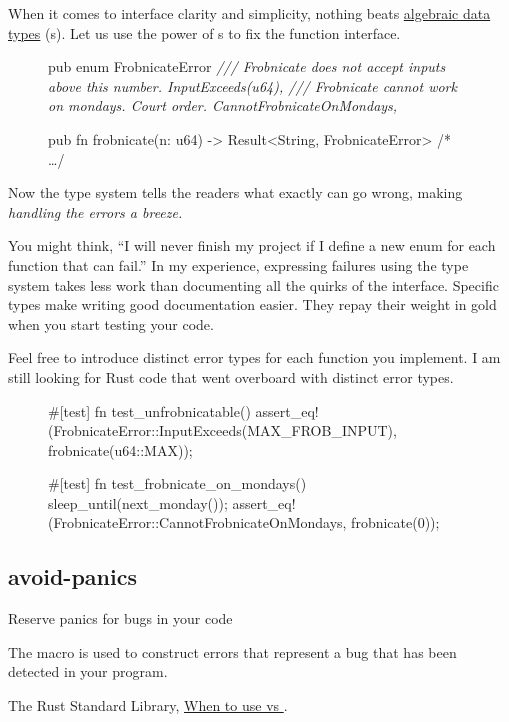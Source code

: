 \documentclass{article}
\begin{document}
When it comes to interface clarity and simplicity, nothing beats \href{https://en.wikipedia.org/wiki/Algebraic_data_type}{algebraic data types} (s).
Let us use the power of s to fix the  function interface.

\begin{figure}
\begin{code}[good]
pub enum FrobnicateError {
  \em{/// Frobnicate does not accept inputs above this number.}
  InputExceeds(u64),
  \em{/// Frobnicate cannot work on mondays. Court order.}
  CannotFrobnicateOnMondays,
}

pub fn frobnicate(n: u64) -> Result<String, FrobnicateError> { /* \ldots  */ }
\end{code}
\end{figure}


Now the type system tells the readers what exactly can go wrong, making \em{handling} the errors a breeze.

You might think, ``I will never finish my project if I define a new enum for each function that can fail.''
In my experience, expressing failures using the type system takes less work than documenting all the quirks of the interface.
Specific types make writing good documentation easier.
They repay their weight in gold when you start testing your code.

Feel free to introduce distinct error types for each function you implement.
I am still looking for Rust code that went overboard with distinct error types.

\begin{figure}
\begin{code}[good]
#[test]
fn test_unfrobnicatable() {
  assert_eq!(FrobnicateError::InputExceeds(MAX_FROB_INPUT), frobnicate(u64::MAX));
}

#[test]
fn test_frobnicate_on_mondays() {
  sleep_until(next_monday());
  assert_eq!(FrobnicateError::CannotFrobnicateOnMondays, frobnicate(0));
}
\end{code}
\end{figure}

\subsection{avoid-panics}{Reserve panics for bugs in your code}
\epigraph{
  The  macro is used to construct errors that represent a bug that has been detected in your program. 
}{The Rust Standard Library, \href{https://doc.rust-lang.org/std/macro.panic.html#when-to-use-panic-vs-result}{When to use  vs }.}
\end{document}
